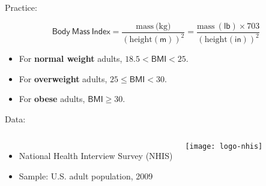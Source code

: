 \documentclass[t]{beamer}
\begin{document}
	
	
	\begin{frame}[t]{Practice: }

		$$\mathsf{Body~Mass~Index} = \frac{\mbox{mass} \ \mbox{(kg)}}{\left( \mbox{height}(\mathsf{m})\right)^2} = \frac{\mbox{mass} \ \mathsf{(lb)} \times 703}{\left(\mbox{height} (\mathsf{in})\right)^2}$$
		
		\vspace{1em}

		\begin{itemize}
			\item For \textbf{normal weight} adults, $18.5 < \mathsf{BMI} < 25$.
			\item For \textbf{overweight} adults, $25 \leq \mathsf{BMI} < 30$.
			\item For \textbf{obese }adults, $\mathsf{BMI} \geq 30$.		
		\end{itemize}

		\vspace{1em}
		
    Data:
	
			\begin{columns}[c]
				
				\begin{itemize}
					\item National Health Interview Survey (NHIS)
					\item Sample: U.S. adult population, 2009
				\end{itemize}
	
				\texttt{[image: logo-nhis]}
			\end{columns}
	
	\end{frame}
\end{document}

